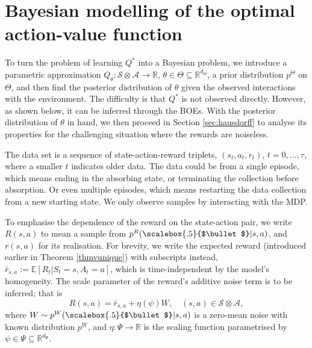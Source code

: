 \documentclass{amsart}
\renewcommand{\cdot}[1][.5]{%
  \mathbin{\vcenter{\hbox{\scalebox{#1}{$\bullet$}}}}%
}
\begin{document}
\section{Bayesian modelling of the optimal action-value function} 
\label{sec:bayesianlearning}

To turn the problem of learning $Q^*$ into a Bayesian problem, we introduce a parametric approximation $Q_\theta:\mathcal{S} \otimes \mathcal{A} \rightarrow \mathbb{R}$, $\theta \in \Theta \subseteq \mathbb{R}^{d_\Theta}$,  a prior distribution  $p^\Theta$ on $\Theta$, and then find the posterior distribution of $\theta$ given the observed interactions with the environment. The difficulty is that $Q^*$ is not observed directly. However, as shown below, it can be inferred through the BOEs. With the posterior distribution of $\theta$ in hand, we then proceed in Section \ref{sec:hausdorff} to analyse its properties for the challenging situation where the rewards are noiseless.

The data set is a sequence of state-action-reward triplets, $(s_t,a_t,r_t)$, $t=0,\ldots,\tau$, where a smaller $t$ indicates older data. The data could be from a single episode, which means ending in the absorbing state, or terminating the collection before absorption. Or even multiple episodes, which means restarting the data collection from a new starting state. We only observe samples by interacting with the MDP.

To emphasise the dependence of the reward on the state-action pair, we write $R(s,a)$ to mean a sample from $p^R(\cdot|s,a)$, and $r(s,a)$ for its realisation. For brevity, we write the expected reward (introduced earlier in Theorem \ref{thmvunique}) with subscripts instead, $\bar{r}_{s,a} := \mathbb{E}[R_t|S_t=s,A_t=a]$, which is time-independent by the model's homogeneity. The scale parameter of the reward's additive noise term is to be inferred; that is
\begin{equation}
    R(s,a) = \bar{r}_{s,a} + \eta(\psi)W,\quad (s,a)\in\mathcal{S}\otimes\mathcal{A},
\end{equation} where $W \sim p^W(\cdot|s,a)$ is a zero-mean noise with known distribution $p^W$, and $\eta:\Psi \rightarrow \mathbb{R}$ is the scaling function parametrised by $\psi \in \Psi \subseteq \mathbb{R}^{d_\Psi}$. 
\end{document}
